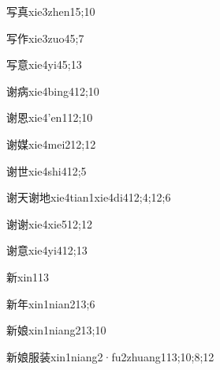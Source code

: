 \begin{verbete}{写真}{xie3zhen1}{5;10}
\end{verbete}
\begin{verbete}{写作}{xie3zuo4}{5;7}
\end{verbete}
\begin{verbete}{写意}{xie4yi4}{5;13}
\end{verbete}
\begin{verbete}{谢病}{xie4bing4}{12;10}
\end{verbete}
\begin{verbete}{谢恩}{xie4'en1}{12;10}
\end{verbete}
\begin{verbete}{谢媒}{xie4mei2}{12;12}
\end{verbete}
\begin{verbete}{谢世}{xie4shi4}{12;5}
\end{verbete}
\begin{verbete}{谢天谢地}{xie4tian1xie4di4}{12;4;12;6}
\end{verbete}
\begin{verbete}{谢谢}{xie4xie5}{12;12}
\end{verbete}
\begin{verbete}{谢意}{xie4yi4}{12;13}
\end{verbete}
\begin{verbete}{新}{xin1}{13}
\end{verbete}
\begin{verbete}{新年}{xin1nian2}{13;6}
\end{verbete}
\begin{verbete}{新娘}{xin1niang2}{13;10}
\end{verbete}
\begin{verbete}{新娘服装}{xin1niang2·fu2zhuang1}{13;10;8;12}
\end{verbete}
